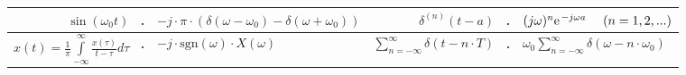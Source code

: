 \begin{landscape}
\begin{center}
\begin{tabular}{|rll|rll|}
    $\sin(\omega_0 t)$ & $\FT$ & $-j\cdot \pi \cdot \left ( \delta(\omega - \omega_0) - \delta(\omega + \omega_0) \right )$ 
    & $\delta^{(n)}(t-a)$&$\FT$ & $(j\omega)^n \e^{-j\omega a} ~~~~ (n=1,2,...)$
  \\ \hline
    $\hat{x}(t) = \frac{1}{\pi}\int\limits_{-\infty}^{\infty} \frac{x(\tau)}{t -
    \tau} d\tau$ & $\FT$ & $-j\cdot \text{sgn}(\omega) \cdot X(\omega)$ &
    $\sum \limits_{n=-\infty}^{\infty} \delta(t-n \cdot T) $ & $\FT$ & $\omega_0
    \sum \limits_{n=-\infty}^{\infty} \delta(\omega - n\cdot \omega_0) $
  \\ \hline
\end{tabular}
\renewcommand{\arraystretch}{1}
\end{center}
\end{landscape}